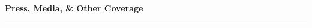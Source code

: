 \documentclass[11pt]{article}
\makeatletter
\def\vhrulefill#1{\leavevmode\leaders\hrule \@height #1\hfill \kern\z@}
\newcommand{\subsectionname}[1]{{\large\bf #1 \vhrulefill{0.5pt}}}
\makeatother
\begin{document}
\begin{longtable}{p{} p{}p{}}




\end{longtable}
\vspace{-12pt}

%
%
%
%
%





\subsectionname{Press, Media, \& Other Coverage}\vspace{-6pt}
\end{document}
